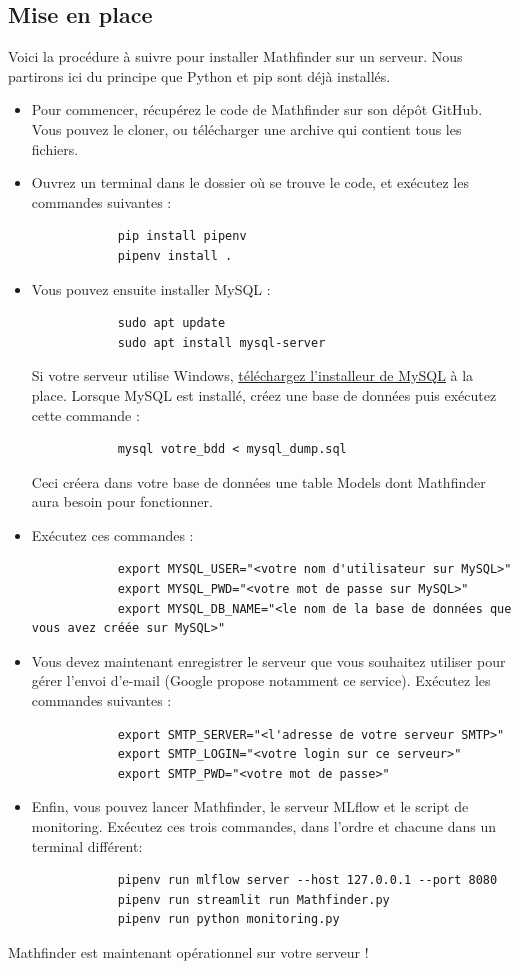 \documentclass[french]{article}
\begin{document}
    \subsection{Mise en place}
    Voici la procédure à suivre pour installer Mathfinder sur un serveur. Nous partirons ici du principe que Python et pip sont déjà installés.
    \begin{itemize}
        \item Pour commencer, récupérez le code de Mathfinder sur son dépôt GitHub. Vous pouvez le cloner, ou télécharger une archive qui contient tous les fichiers.
        \item Ouvrez un terminal dans le dossier où se trouve le code, et exécutez les commandes suivantes :
        \begin{verbatim}
            pip install pipenv
            pipenv install .
        \end{verbatim}
        \item Vous pouvez ensuite installer MySQL :
        \begin{verbatim}
            sudo apt update
            sudo apt install mysql-server
        \end{verbatim}
        Si votre serveur utilise Windows, \href{https://dev.mysql.com/doc/refman/8.3/en/windows-installation.html}{téléchargez l'installeur de MySQL} à la place. Lorsque MySQL est installé, créez une base de données puis exécutez cette commande :
        \begin{verbatim}
            mysql votre_bdd < mysql_dump.sql
        \end{verbatim}
        Ceci créera dans votre base de données une table Models dont Mathfinder aura besoin pour fonctionner.
        \item Exécutez ces commandes :
        \begin{verbatim}
            export MYSQL_USER="<votre nom d'utilisateur sur MySQL>"
            export MYSQL_PWD="<votre mot de passe sur MySQL>"
            export MYSQL_DB_NAME="<le nom de la base de données que vous avez créée sur MySQL>"
        \end{verbatim}
        \item Vous devez maintenant enregistrer le serveur que vous souhaitez utiliser pour gérer l'envoi d'e-mail (Google propose notamment ce service). Exécutez les commandes suivantes :
        \begin{verbatim}
            export SMTP_SERVER="<l'adresse de votre serveur SMTP>"
            export SMTP_LOGIN="<votre login sur ce serveur>"
            export SMTP_PWD="<votre mot de passe>"
        \end{verbatim}
        \item Enfin, vous pouvez lancer Mathfinder, le serveur MLflow et le script de monitoring. Exécutez ces trois commandes, dans l'ordre et chacune dans un terminal différent:
        \begin{verbatim}
            pipenv run mlflow server --host 127.0.0.1 --port 8080
            pipenv run streamlit run Mathfinder.py
            pipenv run python monitoring.py
        \end{verbatim} 
    \end{itemize}
    Mathfinder est maintenant opérationnel sur votre serveur !
\end{document}
